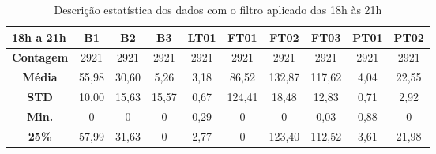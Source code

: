 \begin{table}[!htb]
	\centering
	\caption{Descrição estatística dos dados com o filtro aplicado das 18h às 21h}\label{tb:est}
	\begin{tabular}{@{}cccccccccc@{}}
		\toprule
		\multicolumn{1}{l}{\textbf{18h a 21h}} & \multicolumn{1}{c}{\textbf{B1}} & \multicolumn{1}{c}{\textbf{B2}} & \multicolumn{1}{c}{\textbf{B3}} & \multicolumn{1}{c}{\textbf{LT01}} & \multicolumn{1}{c}{\textbf{FT01}} & \multicolumn{1}{c}{\textbf{FT02}} & \multicolumn{1}{c}{\textbf{FT03}} & \multicolumn{1}{c}{\textbf{PT01}} & \multicolumn{1}{c}{\textbf{PT02}} \\ \midrule
		\textbf{Contagem}                      & 2921                            & 2921                            & 2921                            & 2921                              & 2921                              & 2921                              & 2921                              & 2921                              & 2921                              \\
		\textbf{Média}                         & 55,98                           & 30,60                           & 5,26                            & 3,18                              & 86,52                             & 132,87                            & 117,62                            & 4,04                              & 22,55                             \\
		\textbf{STD}                           & 10,00                           & 15,63                           & 15,57                           & 0,67                              & 124,41                            & 18,48                             & 12,83                             & 0,71                              & 2,92                              \\
		\textbf{Min.}                          & 0                               & 0                               & 0                               & 0,29                              & 0                                 & 0                                 & 0,03                              & 0,88                              & 0                                 \\
		\textbf{25\%}                          & 57,99                           & 31,63                           & 0                               & 2,77                              & 0                                 & 123,40                            & 112,52                            & 3,61                              & 21,98                             \\

\end{tabular}
\end{table}
